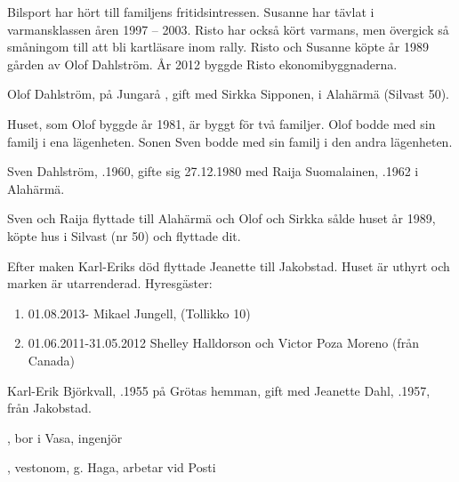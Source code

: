 Bilsport har hört till familjens fritidsintressen. Susanne har tävlat i varmansklassen åren 1997 – 2003. Risto har också kört varmans, men övergick så småningom till att bli kartläsare inom rally. Risto och Susanne köpte år 1989 gården av Olof Dahlström. År 2012 byggde Risto ekonomibyggnaderna.


Olof Dahlström,  på Jungarå , gift med Sirkka Sipponen,  i Alahärmä (Silvast 50).
\begin{jhchildren}
  \item {}
  \item {}
  \item {}
\end{jhchildren}

Huset, som Olof byggde år 1981, är byggt för två familjer. Olof bodde med sin familj i ena lägenheten. Sonen Sven bodde med sin familj i den andra lägenheten.

Sven Dahlström, .1960, gifte sig 27.12.1980 med Raija Suomalainen, .1962 i Alahärmä.
\begin{jhchildren}
  \item {}
  \item {}
\end{jhchildren}

Sven och Raija flyttade till Alahärmä och Olof och Sirkka sålde huset år 1989, köpte hus i Silvast (nr 50) och flyttade dit.






Efter maken Karl-Eriks död flyttade Jeanette till Jakobstad. Huset är uthyrt och marken är utarrenderad.
Hyresgäster:
\begin{enumerate}
  \item 01.08.2013-   Mikael Jungell,  (Tollikko 10)
  \item 01.06.2011-31.05.2012  Shelley Halldorson och Victor Poza Moreno (från Canada)
\end{enumerate}


Karl-Erik Björkvall, .1955 på Grötas hemman, gift med Jeanette Dahl, .1957, från Jakobstad.
\begin{jhchildren}
  \item {}, bor i Vasa, ingenjör
  \item {}, vestonom, g. Haga, arbetar vid Posti
\end{jhchildren}



